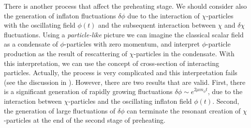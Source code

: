\documentclass[11pt,a4paper,twoside]{book}
\begin{document}
There is another process that affect the preheating stage. We should consider also the generation of inflaton fluctuations $\delta \phi$ due to the interaction of $\chi$-particles with the oscillating field $\phi(t)$ and the subsequent interaction between $\chi$ and $\delta \chi$ fluctuations. Using a \textit{particle-like} picture we can imagine the classical scalar field as a condensate of $\phi$-particles with zero momentum, and interpret $\phi$-particle production as the result of rescattering of $ \chi $-particles in the condensate. With this interpretation, we can use the concept of cross-section of interacting particles. Actually, the process is very complicated and this interpretation fails (see the discussion in \cite{Chap4:LindePreheatingModel}). However, there are two results that are valid. First, there is a significant generation of rapidly growing fluctuations $ \delta \phi \sim e^{2\mu m_{\phi}t} $, due to the interaction between $ \chi $-particles and the oscillating inflaton field $ \phi(t) $. Second, the generation of large fluctuations of $\delta \phi$ can terminate the resonant creation of $\chi$-particles at the end of the second stage of preheating. 
\end{document}
